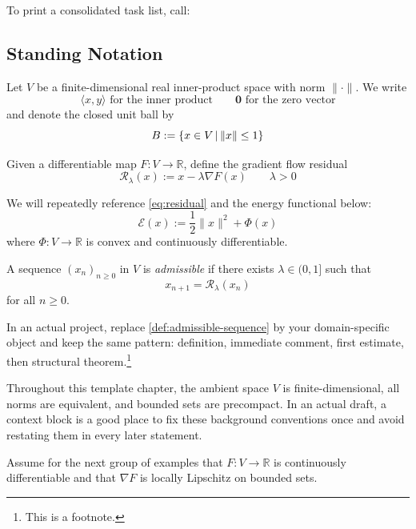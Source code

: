 To print a consolidated task list, call:
\listoftodos

\subsection{Standing Notation}
\label{ssec:standing-notation}

Let $V$ be a finite-dimensional real inner-product space with norm $\|\cdot\|$. We write
\[
\langle x,y\rangle \text{ for the inner product} \qquad \mathbf{0} \text{ for the zero vector}
\]
and denote the closed unit ball by
\[
B:=\left\{x\in V\,|\,\|x\|\le 1\right\}
\]

Given a differentiable map $F:V\to\mathbb{R}$, define the gradient flow residual
\begin{equation}
\label{eq:residual}
\mathcal{R}_\lambda(x):=x-\lambda\nabla F(x)\qquad \lambda>0
\end{equation}

We will repeatedly reference \cref{eq:residual} and the energy functional below:
\begin{equation}
\label{eq:energy}
\mathcal{E}(x):=\frac12\|x\|^2+\Phi(x)
\end{equation}
where $\Phi:V\to\mathbb{R}$ is convex and continuously differentiable.

\begin{definition}
\label{def:admissible-sequence}
A sequence $(x_n)_{n\ge 0}$ in $V$ is \emph{admissible} if there exists $\lambda\in(0,1]$ such that
\[
x_{n+1}=\mathcal{R}_\lambda(x_n)
\]
for all $n\ge 0$.
\end{definition}

\begin{remark}
\label{rem:adapt-model}
In an actual project, replace \cref{def:admissible-sequence} by your domain-specific object and keep the same pattern: definition, immediate comment, first estimate, then structural theorem.\footnote{This is a footnote.}
\end{remark}

\begin{context}
\label{ctx:baseline-setting}
Throughout this template chapter, the ambient space $V$ is finite-dimensional, all norms are equivalent, and bounded sets are precompact. In an actual draft, a context block is a good place to fix these background conventions once and avoid restating them in every later statement.
\end{context}

\begin{assumption}
\label{ass:smoothness-regime}
Assume for the next group of examples that $F:V\to\mathbb{R}$ is continuously differentiable and that $\nabla F$ is locally Lipschitz on bounded sets.
\end{assumption}

